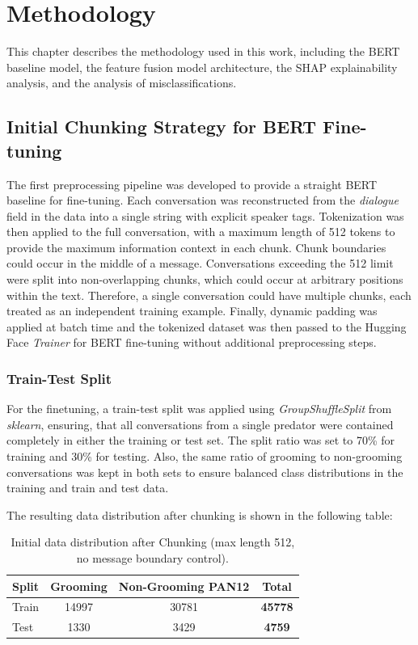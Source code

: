 \chapter{Methodology} \label{sec:methodology}
This chapter describes the methodology used in this work, including the BERT baseline model, the feature fusion model architecture, the SHAP explainability analysis, and the analysis of misclassifications.
\section{Initial Chunking Strategy for BERT Fine-tuning}

The first preprocessing pipeline was developed to provide a straight BERT baseline for fine-tuning. Each conversation was reconstructed from the \textit{dialogue} field in the data into a single string with explicit speaker tags. Tokenization was then applied to the full conversation, with a maximum length of 512 tokens to provide the maximum information context in each chunk. Chunk boundaries could occur in the middle of a message. Conversations exceeding the 512 limit were split into non-overlapping chunks, which could occur at arbitrary positions within the text. Therefore, a single conversation could have multiple chunks, each treated as an independent training example. Finally, dynamic padding was applied at batch time and the tokenized dataset was then passed to the Hugging Face \textit{Trainer} for BERT fine-tuning without additional preprocessing steps.


\subsection{Train-Test Split}
For the finetuning, a train-test split was applied using \textit{GroupShuffleSplit} from \textit{sklearn}, ensuring, that all conversations from a single predator were contained completely in either the training or test set.  The split ratio was set to 70\% for training and 30\% for testing. Also, the same ratio of grooming to non-grooming conversations was kept in both sets to ensure balanced class distributions in the training and train and test data.

The resulting data distribution after chunking is shown in the following table:

\begin{table}[H] 
\label{tab:initial_split} 
\centering
\small
\caption[Initial data distribution after chunking]{Initial data distribution after Chunking (max length 512, no message boundary control).}
\begin{tabular}{lccc}
\hline
Split & Grooming & Non-Grooming PAN12  & \textbf{Total} \\
\hline
Train & 14997 & 30781  & \textbf{45778} \\
Test  & 1330 & 3429   & \textbf{4759} \\
\end{tabular}
\end{table}

